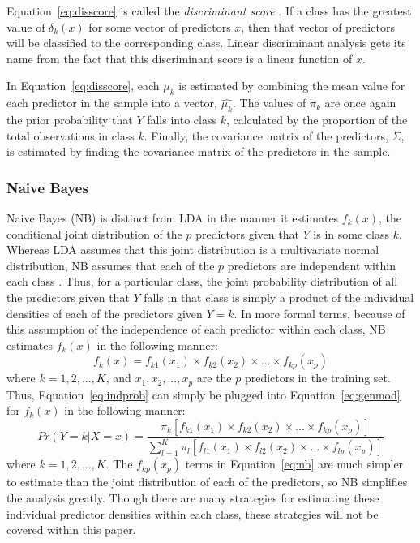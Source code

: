 \documentclass[12pt]{article}
\begin{document}
Equation~\eqref{eq:disscore} is called the \textit{discriminant score} 
\citep{james2021introduction}.  If a class has the greatest value of $\delta_k(x)$ for some 
vector of predictors $x$, then that vector of predictors will be classified to the corresponding 
class.  Linear discriminant analysis gets its name from the fact that this discriminant score is 
a linear function of $x$.

In Equation~\eqref{eq:disscore}, each $\mu_k$ is estimated by combining the mean value for each 
predictor in the sample into a vector, $\hat{\mu_k}$.  The values of $\pi_k$ are once again the 
prior probability that $Y$ falls into class $k$, calculated by the proportion of the total 
observations in class $k$.  Finally, the covariance matrix of the predictors, $\Sigma$, is 
estimated by finding the covariance matrix of the predictors in the sample.     

\subsubsection{Naive Bayes}
\label{sec:nb}

Naive Bayes (NB) is distinct from LDA in the manner it estimates $f_k(x)$, the conditional 
joint distribution of the $p$ predictors given that $Y$ is in some class $k$.  Whereas LDA 
assumes that this joint distribution is a multivariate normal distribution, NB assumes that 
each of the $p$ predictors are independent within each class \citep{james2021introduction}.  
Thus, for a particular class, the joint probability distribution of all the predictors given 
that $Y$ falls in that class is simply a product of the individual densities of each of the 
predictors given $Y = k$.  In more formal terms, because of this assumption of the independence 
of each predictor within each class, NB estimates $f_k(x)$ in the following manner:
\begin{equation}
  \label{eq:indprob}
  f_k(x) = f_{k1}(x_1) \times f_{k2}(x_2) \times ... \times f_{kp}(x_p)
\end{equation} 
where $k = 1, 2, ..., K$, and $x_1, x_2, ..., x_p$ are the $p$ predictors in the training set.  
Thus, Equation~\eqref{eq:indprob} can simply be plugged into Equation~\eqref{eq:genmod} for 
$f_k(x)$ in the following manner:
\begin{equation}
  \label{eq:nb}
   Pr(Y = k | X = x) =
  \frac{\pi_k [f_{k1}(x_1) \times f_{k2}(x_2) \times ... \times f_{kp}(x_p)]} 
  {\sum_{l = 1} ^ {K} \pi_l [f_{l1}(x_1) \times f_{l2}(x_2) \times ... \times f_{lp}(x_p)]}
\end{equation} 
where $k = 1, 2, ..., K$.  The $f_{kp}(x_p)$ terms in Equation~\eqref{eq:nb} are much simpler 
to estimate than the joint distribution of each of the predictors, so NB simplifies the 
analysis greatly.  Though there are many strategies for estimating these individual predictor 
densities within each class, these strategies will not be covered within this paper.  
\end{document}
